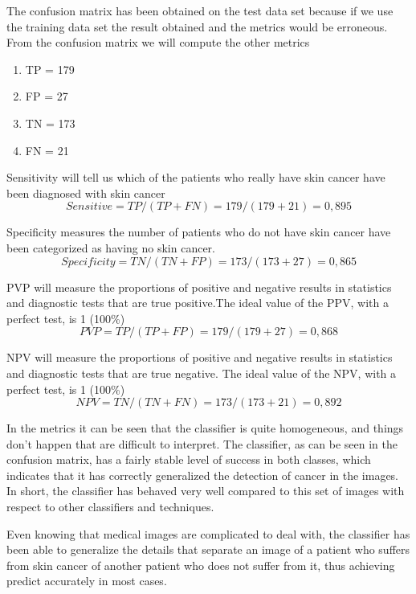 The confusion matrix has been obtained on the test data set because if we use the training data set the result obtained and the metrics would be erroneous. From the confusion matrix we will compute the other metrics

\begin{enumerate}
\item TP = 179
\item FP = 27
\item TN = 173
\item FN = 21
\end{enumerate}

Sensitivity will tell us which of the patients who really have skin cancer have been diagnosed with skin cancer
\[ Sensitive = TP/(TP+FN) = 179 / (179+21) = 0,895 \]

Specificity measures the number of patients who do not have skin cancer have been categorized as having no skin cancer.
\[ Specificity  = TN/(TN+FP) = 173 / (173+27) = 0,865 \]

PVP will measure the proportions of positive and negative results in statistics and diagnostic tests that are true positive.The ideal value of the PPV, with a perfect test, is 1 (100\%)
\[ PVP = TP/(TP+FP) = 179 / (179+27) = 0,868 \]

NPV will measure the proportions of positive and negative results in statistics and diagnostic tests that are true negative. The ideal value of the NPV, with a perfect test, is 1 (100\%)
\[ NPV = TN/(TN+FN) = 173 / (173+21) = 0,892 \]

In the metrics it can be seen that the classifier is quite homogeneous, and things don't happen that are difficult to interpret. The classifier, as can be seen in the confusion matrix, has a fairly stable level of success in both classes, which indicates that it has correctly generalized the detection of cancer in the images. In short, the classifier has behaved very well compared to this set of images with respect to other classifiers and techniques. 

Even knowing that medical images are complicated to deal with, the classifier has been able to generalize the details that separate an image of a patient who suffers from skin cancer of another patient who does not suffer from it, thus achieving predict accurately in most cases.
